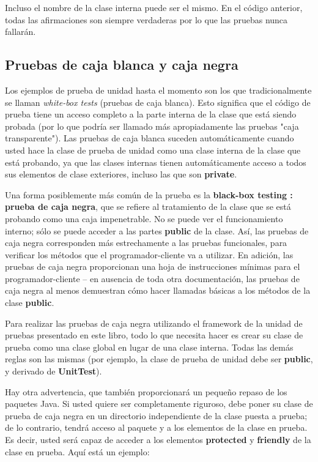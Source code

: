 Incluso el nombre de la clase interna puede ser el mismo. En el código anterior, todas las afirmaciones son siempre verdaderas por lo que las pruebas nunca fallarán.

\subsection*{Pruebas de caja blanca y caja negra}
\label{subsec:pdcbycn}

Los ejemplos de prueba de unidad hasta el momento son los que tradicionalmente se llaman \textit{white-box tests} (pruebas de caja blanca). Esto significa que el código de prueba tiene un acceso completo a la parte interna de la clase que está siendo probada 
(por lo que podría ser llamado más apropiadamente las pruebas "caja transparente"). Las pruebas de caja blanca suceden automáticamente cuando usted hace la clase de prueba de unidad como una clase interna de la clase que está probando, ya que las clases internas tienen automáticamente acceso a todos sus elementos de clase exteriores, incluso las que son \textbf{private}.   \newline

Una forma posiblemente más común de la prueba es la \textbf{black-box testing :  prueba de caja negra}, que se refiere al tratamiento de la clase que se está probando como una caja impenetrable. No se puede ver el funcionamiento interno; sólo se puede acceder a las partes \textbf{public}  de la clase. Así, las pruebas de caja negra corresponden más estrechamente a las pruebas funcionales, para verificar los métodos que el programador-cliente va a utilizar. En adición, las pruebas de caja negra proporcionan una hoja de instrucciones mínimas para el programador-cliente  – en ausencia de toda otra documentación, las pruebas de caja negra al menos demuestran cómo hacer llamadas básicas a los métodos de la clase \textbf{public}.    \newline

Para realizar las pruebas de caja negra utilizando el framework de la unidad de pruebas presentado en este libro, todo lo que necesita hacer es crear su clase de prueba como una clase global en lugar de una clase interna. Todas las demás reglas son las mismas (por ejemplo, la clase de prueba de unidad debe ser \textbf{public}, y derivado de \textbf{UnitTest}).     \newline

Hay otra advertencia, que también proporcionará un pequeño repaso de los paquetes Java. Si usted quiere ser completamente riguroso, debe poner su clase de prueba de caja negra en un directorio independiente de la clase puesta a prueba; de lo contrario, tendrá acceso al paquete y a los elementos de la clase en prueba. Es decir, usted será capaz de acceder a los elementos \textbf{protected} y \textbf{friendly} de la clase en prueba. Aquí está un ejemplo: \newline

